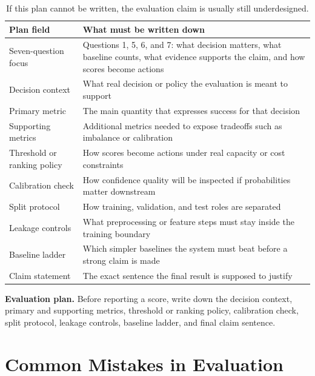 \begin{table}[t]
\centering
\small
\setlength{\tabcolsep}{4pt}
\begin{tabular}{p{3.2cm}p{7.03cm}}
\toprule
Plan field & What must be written down \\
\midrule
Seven-question focus & Questions 1, 5, 6, and 7: what decision matters, what baseline counts, what evidence supports the claim, and how scores become actions \\
Decision context & What real decision or policy the evaluation is meant to support \\
Primary metric & The main quantity that expresses success for that decision \\
Supporting metrics & Additional metrics needed to expose tradeoffs such as imbalance or calibration \\
Threshold or ranking policy & How scores become actions under real capacity or cost constraints \\
Calibration check & How confidence quality will be inspected if probabilities matter downstream \\
Split protocol & How training, validation, and test roles are separated \\
Leakage controls & What preprocessing or feature steps must stay inside the training boundary \\
Baseline ladder & Which simpler baselines the system must beat before a strong claim is made \\
Claim statement & The exact sentence the final result is supposed to justify \\
\bottomrule
\end{tabular}
\caption{If this plan cannot be written, the evaluation claim is usually still underdesigned.}
\label{tab:evaluation-plan}
\end{table}

\begin{thinkingtool}
\textbf{Evaluation plan.} Before reporting a score, write down the decision context, primary and supporting metrics, threshold or ranking policy, calibration check, split protocol, leakage controls, baseline ladder, and final claim sentence.
\end{thinkingtool}

\section{Common Mistakes in Evaluation}


